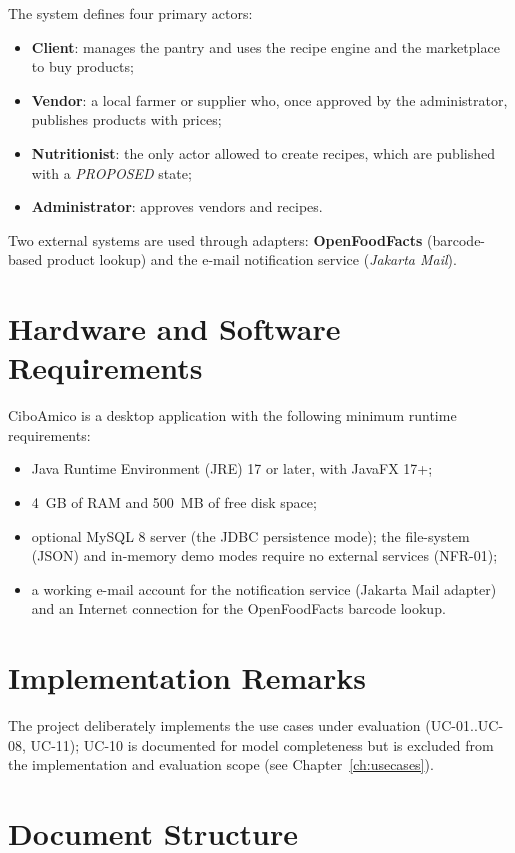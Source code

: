 The system defines four primary actors:
\begin{itemize}
    \item \textbf{Client}: manages the pantry and uses the recipe
    engine and the marketplace to buy products;
    \item \textbf{Vendor}: a local farmer or supplier who, once
    approved by the administrator, publishes products with prices;
    \item \textbf{Nutritionist}: the only actor allowed to
    create recipes, which are published with a \emph{PROPOSED} state;
    \item \textbf{Administrator}: approves vendors and
    recipes.
\end{itemize}

Two external systems are used through adapters: \textbf{OpenFoodFacts}
(barcode-based product lookup) and the e-mail notification service
(\emph{Jakarta Mail}).

\section{Hardware and Software Requirements}

CiboAmico is a desktop application with the following minimum runtime
requirements:
\begin{itemize}
    \item Java Runtime Environment (JRE) 17 or later, with JavaFX 17+;
    \item 4~GB of RAM and 500~MB of free disk space;
    \item optional MySQL 8 server (the JDBC persistence mode); the
    file-system (JSON) and in-memory demo modes require no external
    services (NFR-01);
    \item a working e-mail account for the notification service
    (Jakarta Mail adapter) and an Internet connection for the
    OpenFoodFacts barcode lookup.
\end{itemize}

\section{Implementation Remarks}

The project deliberately implements the use cases under evaluation
(UC-01..UC-08, UC-11); UC-10 is documented for model completeness but is
excluded from the implementation and evaluation scope (see
Chapter~\ref{ch:usecases}).

\section{Document Structure}

